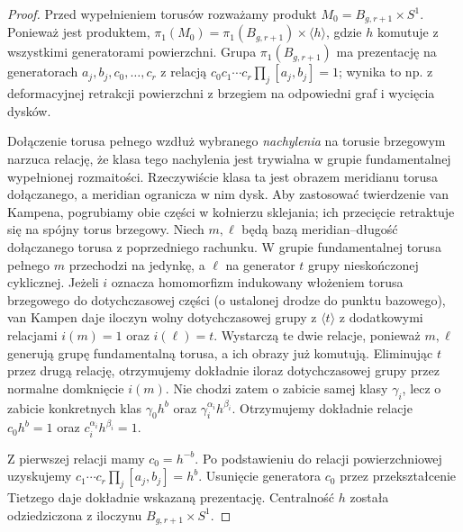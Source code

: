 \begin{proof}
Przed wypełnieniem torusów rozważamy produkt
$M_0=B_{g,r+1}\times S^1$. Ponieważ jest produktem,
$\pi_1(M_0)=\pi_1(B_{g,r+1})\times\langle h\rangle$,
gdzie $h$ komutuje z wszystkimi generatorami
powierzchni. Grupa $\pi_1(B_{g,r+1})$ ma
prezentację na generatorach $a_j,b_j,c_0,\ldots,c_r$
z relacją $c_0c_1\cdots c_r\prod_j[a_j,b_j]=1$;
wynika to np. z deformacyjnej retrakcji powierzchni
z brzegiem na odpowiedni graf i wycięcia dysków.

Dołączenie torusa pełnego wzdłuż wybranego
\emph{nachylenia} na torusie brzegowym narzuca relację,
że klasa tego nachylenia jest trywialna w grupie
fundamentalnej wypełnionej rozmaitości. Rzeczywiście
klasa ta jest obrazem meridianu torusa dołączanego,
a meridian ogranicza w nim dysk. Aby zastosować twierdzenie van Kampena, pogrubiamy
obie części w kołnierzu sklejania; ich przecięcie
retraktuje się na spójny torus brzegowy.
Niech $m,\ell$ będą bazą meridian--długość
dołączanego torusa z poprzedniego rachunku.
W grupie fundamentalnej torusa pełnego
$m$ przechodzi na jedynkę, a $\ell$ na generator $t$
grupy nieskończonej cyklicznej.
Jeżeli $i$ oznacza homomorfizm indukowany
włożeniem torusa brzegowego do dotychczasowej części
(o ustalonej drodze do punktu bazowego),
van Kampen daje iloczyn wolny dotychczasowej grupy
z $\langle t\rangle$ z dodatkowymi relacjami
$i(m)=1$ oraz $i(\ell)=t$.
Wystarczą te dwie relacje, ponieważ $m,\ell$
generują grupę fundamentalną torusa, a ich obrazy
już komutują. Eliminując $t$ przez drugą relację,
otrzymujemy dokładnie iloraz dotychczasowej grupy
przez normalne domknięcie $i(m)$.
Nie chodzi zatem o zabicie samej klasy $\gamma_i$,
lecz o zabicie konkretnych klas
$\gamma_0h^b$ oraz $\gamma_i^{\alpha_i}h^{\beta_i}$.
Otrzymujemy dokładnie relacje $c_0h^b=1$ oraz
$c_i^{\alpha_i}h^{\beta_i}=1$.

Z pierwszej relacji mamy $c_0=h^{-b}$. Po podstawieniu
do relacji powierzchniowej uzyskujemy
$c_1\cdots c_r\prod_j[a_j,b_j]=h^b$.
Usunięcie generatora $c_0$ przez przekształcenie
Tietzego daje dokładnie wskazaną prezentację.
Centralność $h$ została odziedziczona z iloczynu
$B_{g,r+1}\times S^1$.
\end{proof}

